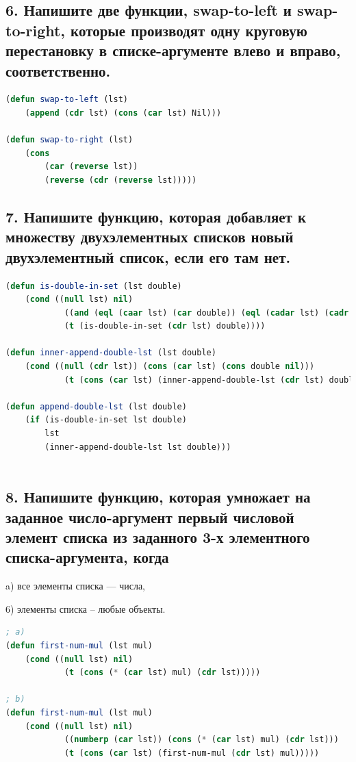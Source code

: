 \documentclass[12pt]{report}
\begin{document}
\subsection*{6. Напишите две функции, swap-to-left и swap-to-right, которые производят одну круговую
	перестановку в списке-аргументе влево и вправо, соответственно.}

\begin{lstlisting}[label=6xd, caption=Решение задания №6, language=lisp]
(defun swap-to-left (lst) 
	(append (cdr lst) (cons (car lst) Nil)))

(defun swap-to-right (lst)
	(cons
		(car (reverse lst))
		(reverse (cdr (reverse lst)))))

\end{lstlisting}

\newpage
\subsection*{7. Напишите функцию, которая добавляет к множеству двухэлементных списков новый
	двухэлементный список, если его там нет.}

\begin{lstlisting}[label=6xd, caption=Решение задания №7, language=lisp]	
(defun is-double-in-set (lst double) 
	(cond ((null lst) nil) 
			((and (eql (caar lst) (car double)) (eql (cadar lst) (cadr double))) t)
			(t (is-double-in-set (cdr lst) double))))
			
(defun inner-append-double-lst (lst double)
	(cond ((null (cdr lst)) (cons (car lst) (cons double nil)))
			(t (cons (car lst) (inner-append-double-lst (cdr lst) double)))))
			
(defun append-double-lst (lst double)
	(if (is-double-in-set lst double)
		lst
		(inner-append-double-lst lst double)))
	
\end{lstlisting}

\subsection*{8. Напишите функцию, которая умножает на заданное число-аргумент первый числовой
	элемент списка из заданного 3-х элементного списка-аргумента, когда}

a) все элементы списка --- числа,

6) элементы списка -- любые объекты.

\begin{lstlisting}[label=6xd, caption=Решение задания №8, language=lisp]
; a)
(defun first-num-mul (lst mul) 
	(cond ((null lst) nil)
			(t (cons (* (car lst) mul) (cdr lst)))))
			
; b)
(defun first-num-mul (lst mul)
	(cond ((null lst) nil)
			((numberp (car lst)) (cons (* (car lst) mul) (cdr lst)))
			(t (cons (car lst) (first-num-mul (cdr lst) mul)))))

\end{lstlisting}
\end{document}
